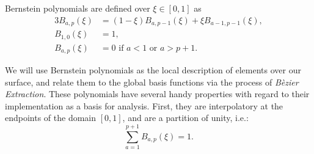 \documentclass[./]{subfiles}
\begin{document}
Bernstein polynomials are defined over $\xi \in [0,1]$ as 
\begin{alignat}{3}
B_{a, p}(\xi) &= (1-\xi) B_{a, p-1}(\xi) + \xi B_{a-1,p-1}(\xi), \\
B_{1, 0}(\xi) &= 1, \\
B_{a, p}(\xi) &= 0 \text{ if } a<1 \text{ or } a > p+1.
\end{alignat}

We will use Bernstein polynomials as the local description of elements over our surface, and relate them to the global basis functions via the process of \textit{B\`ezier Extraction}. These polynomials have several handy properties with regard to their implementation as a basis for analysis. First, they are interpolatory at the endpoints of the domain $[0,1]$, and are a partition of unity, i.e.:
\begin{equation*}
\sum_{a=1}^{p+1} B_{a,p}(\xi) = 1.
\end{equation*}
\end{document}
